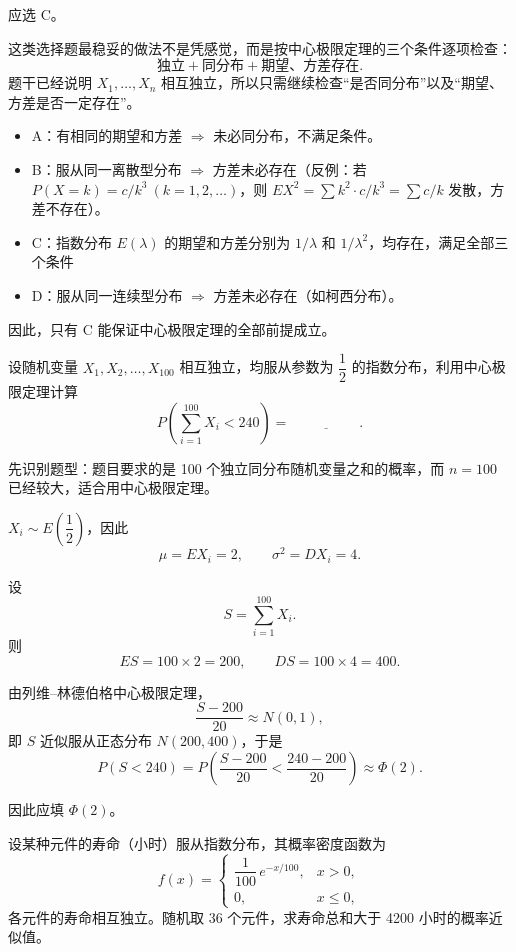 ﻿\documentclass[lang=cn,11pt]{elegantbook}
\begin{document}
\begin{solution}
应选 C。

这类选择题最稳妥的做法不是凭感觉，而是按中心极限定理的三个条件逐项检查：
\[
\text{独立}+\text{同分布}+\text{期望、方差存在}.
\]
题干已经说明 \(X_1,\dots,X_n\) 相互独立，所以只需继续检查“是否同分布”以及“期望、方差是否一定存在”。

\begin{itemize}
    \item A：有相同的期望和方差 \(\Rightarrow\) 未必同分布，不满足条件。
    \item B：服从同一离散型分布 \(\Rightarrow\) 方差未必存在（反例：若 \(P(X=k)=c/k^3\ (k=1,2,\dots)\)，则 \(EX^2=\sum k^2\cdot c/k^3=\sum c/k\) 发散，方差不存在）。
    \item C：指数分布 \(E(\lambda)\) 的期望和方差分别为 \(1/\lambda\) 和 \(1/\lambda^2\)，均存在，满足全部三个条件 \checkmark
    \item D：服从同一连续型分布 \(\Rightarrow\) 方差未必存在（如柯西分布）。
\end{itemize}

因此，只有 C 能保证中心极限定理的全部前提成立。
\end{solution}

\begin{exercise}\label{exer:5-clt-exp100}
设随机变量 \(X_1, X_2, \dots, X_{100}\) 相互独立，均服从参数为 \(\dfrac{1}{2}\) 的指数分布，利用中心极限定理计算
\[
P\!\left(\sum_{i=1}^{100} X_i < 240\right) =\,\underline{\hspace{2cm}}.
\]
\end{exercise}

\begin{solution}
先识别题型：题目要求的是 100 个独立同分布随机变量之和的概率，而 \(n=100\) 已经较大，适合用中心极限定理。

\(X_i \sim E\!\left(\dfrac{1}{2}\right)\)，因此
\[
\mu=EX_i=2,\qquad \sigma^2=DX_i=4.
\]

设
\[
S=\sum_{i=1}^{100} X_i.
\]
则
\[
ES=100\times 2=200,\qquad DS=100\times 4=400.
\]

由列维--林德伯格中心极限定理，
\[
\frac{S-200}{20}\approx N(0,1),
\]
即 \(S\) 近似服从正态分布 \(N(200,400)\)，于是
\[
P(S < 240) = P\!\left(\frac{S - 200}{20} < \frac{240 - 200}{20}\right) \approx \Phi(2).
\]

因此应填 \(\Phi(2)\)。
\end{solution}

\begin{exercise}\label{exer:5-clt-exp36}
设某种元件的寿命（小时）服从指数分布，其概率密度函数为
\[
f(x) = \begin{cases} \dfrac{1}{100}\,e^{-x/100}, & x > 0, \\[4pt] 0, & x \leq 0, \end{cases}
\]
各元件的寿命相互独立。随机取 36 个元件，求寿命总和大于 4200 小时的概率近似值。
\end{exercise}
\end{document}
